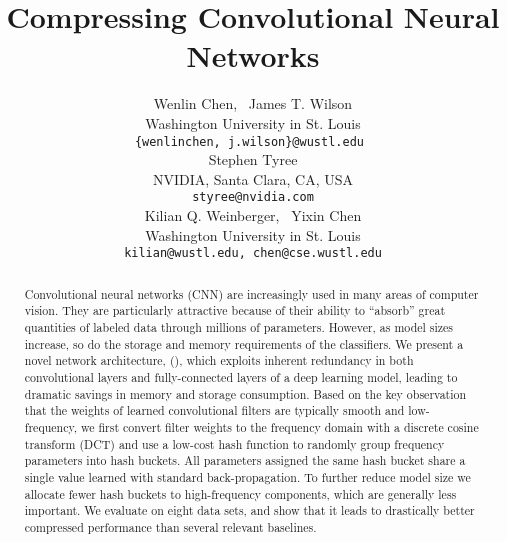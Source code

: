 \documentclass{article} %
\title{Compressing Convolutional Neural Networks}
\author{
Wenlin Chen, ~James T. Wilson\\
Washington University in St. Louis\\
\texttt{\{wenlinchen, j.wilson\}@wustl.edu } \\
\And
Stephen Tyree\\
NVIDIA, Santa Clara, CA, USA\\
\texttt{styree@nvidia.com} \\
\AND
Kilian Q. Weinberger, ~Yixin Chen\\
Washington University in St. Louis \\
\texttt{kilian@wustl.edu, chen@cse.wustl.edu} \\
}
\begin{document}
\maketitle

\begin{abstract}
Convolutional neural networks (CNN) are increasingly used in many areas of computer vision. They are particularly attractive because of their ability to ``absorb'' great quantities of labeled data through millions of parameters. However, as model sizes increase, so do the storage and memory requirements of the classifiers. We present a novel network architecture, \fullname{} (\abbrev{}), which exploits inherent redundancy in both convolutional layers and fully-connected layers of a deep learning model, leading to dramatic savings in memory and storage consumption. Based on the key observation that the weights of learned convolutional filters are typically smooth and low-frequency, we first convert filter weights to the frequency domain with a discrete cosine transform (DCT) and use a low-cost hash function to randomly group frequency parameters into hash buckets. All parameters assigned the same hash bucket share a single value learned with standard back-propagation.
To further reduce model size we allocate fewer hash buckets to high-frequency components, which are generally less important.
We evaluate \abbrev{} on eight data sets, and show that it leads to drastically better compressed performance than several relevant baselines.


\end{abstract}
\end{document}
